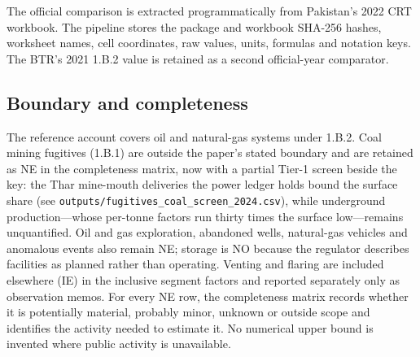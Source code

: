 The official comparison is extracted programmatically from Pakistan's 2022 CRT workbook. The
pipeline stores the package and workbook SHA-256 hashes, worksheet names, cell coordinates, raw
values, units, formulas and notation keys. The BTR's 2021 1.B.2 value is retained as a second
official-year comparator.

\subsection{Boundary and completeness}

The reference account covers oil and natural-gas systems under 1.B.2. Coal mining fugitives
(1.B.1) are outside the paper's stated boundary and are retained as NE in the completeness
matrix, now with a partial Tier-1 screen beside the key: the Thar mine-mouth deliveries the
power ledger holds bound the surface share (see
\texttt{outputs/fugitives\_coal\_screen\_2024.csv}), while underground production---whose
per-tonne factors run thirty times the surface low---remains unquantified. Oil and gas exploration, abandoned wells, natural-gas vehicles and anomalous events
also remain NE; storage is NO because the regulator describes facilities as planned rather
than operating. Venting and flaring are included elsewhere (IE) in the inclusive segment
factors and reported separately only as observation memos.
For every NE row, the completeness matrix records whether it is potentially material, probably
minor, unknown or outside scope and identifies the activity needed to estimate it. No numerical
upper bound is invented where public activity is unavailable.
